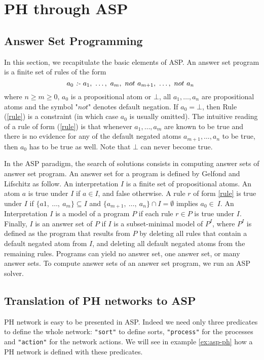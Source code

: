 
\section{PH through ASP}
\label{sec:ph-asp}
\subsection{Answer Set Programming}

	In this section, we recapitulate the basic elements of ASP.
	An answer set program is a finite set of rules of the form
	\begin{equation}
		\label{rule}
		a_{0}\ \emph{:-}\ a_{1},\ \ldots,\ a_{m},\ not\ a_{m+1},\ \ldots,\ not\ a_{n}\
	\end{equation}
	where $n \ge m \ge 0$, $a_{0}$ is a propositional atom or $\bot$, all
	$a_{1}, \ldots ,a_{n}$ are propositional atoms and the symbol "$not$" denotes default negation.
	If $a_{0} = \bot$, then Rule (\ref{rule}) is a constraint (in which case $a_{0}$ is usually omitted).
	The intuitive reading of a rule of form (\ref{rule}) is that whenever $a_{1}, \ldots, a_{m}$
	are known to be true and there is no evidence for any of the default negated atoms $a_{m+1}, \ldots, a_{n}$ to be true, then $a_{0}$ has to be true as well.
	Note that $\bot$ can never become true.
	
	In the ASP paradigm, the search of solutions consists in computing answer sets of answer set program.
	An answer set for a program is defined by Gelfond and Lifschitz \cite{DBLP:conf/iclp/GelfondL88} as follow.
	An interpretation $I$ is a finite set of propositional atoms.
	An atom $a$ is true under $I$ if $a \in I$, and false otherwise.
	A rule $r$ of form \ref{rule} is true under $I$ if $\{a1,\ \dots,\ a_{m}\} \subseteq I$ and $\{a_{m+1},\ \ldots,\ a_{n}\} \cap I = \emptyset$ implies $a_{0} \in\ I$.
	An Interpretation $I$ is a model of a program $P$ if each rule $r \in P$ is true under $I$.
	Finally, $I$ is an answer set of $P$ if $I$ is a subset-minimal model of $P^{I}$,
	where $P^{I}$ is defined as the program that results from $P$ by deleting all rules that contain a default negated atom from $I$, 
	and deleting all default negated atoms from the remaining rules.
	Programs can yield no answer set, one answer set, or many answer sets.
	To compute answer sets of an answer set program, we run an ASP solver.

\subsection{Translation of PH networks to ASP}
PH network is easy to be presented in ASP. Indeed we need only three predicates to define the whole network:
\texttt{"sort"} to define sorts, \texttt{"process"} for the processes and \texttt{"action"} for the network actions. We will see in example \ref{ex:asp-ph} how a PH network is defined with these predicates.

